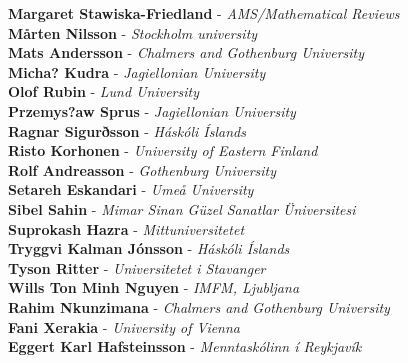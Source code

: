 \documentclass[12pt,openany]{report}      %
\begin{document}
\textbf{Margaret Stawiska-Friedland} - 
\textit{AMS/Mathematical Reviews}
\\
\textbf{Mårten Nilsson} - 
\textit{Stockholm university}
\\
\textbf{Mats Andersson} - 
\textit{Chalmers and Gothenburg University}
\\
\textbf{Micha? Kudra} - 
\textit{Jagiellonian University}
\\
\textbf{Olof Rubin} - 
\textit{Lund University}
\\
\textbf{Przemys?aw Sprus} - 
\textit{Jagiellonian University}
\\
\textbf{Ragnar Sigurðsson} - 
\textit{Háskóli Íslands}
\\
\textbf{Risto Korhonen} - 
\textit{University of Eastern Finland}
\\
\textbf{Rolf Andreasson} - 
\textit{Gothenburg University}
\\
\textbf{Setareh Eskandari} - 
\textit{Umeå University}
\\
\textbf{Sibel Sahin} - 
\textit{Mimar Sinan Güzel Sanatlar Üniversitesi}
\\
\textbf{Suprokash Hazra} - 
\textit{Mittuniversitetet}
\\
\textbf{Tryggvi Kalman Jónsson} - 
\textit{Háskóli Íslands}
\\
\textbf{Tyson Ritter} - 
\textit{Universitetet i Stavanger}
\\
\textbf{Wills Ton Minh Nguyen} - 
\textit{IMFM, Ljubljana}
\\
\textbf{Rahim Nkunzimana} - 
\textit{Chalmers and Gothenburg University}
\\
\textbf{Fani Xerakia} - 
\textit{University of Vienna}
\\
\textbf{Eggert Karl Hafsteinsson} - 
\textit{Menntaskólinn í Reykjavík}
\restoregeometry

\newpage
\end{document}
